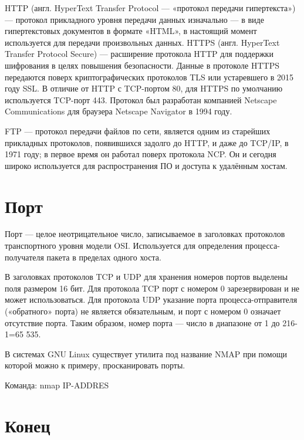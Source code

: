 \documentclass[a4paper,14pt]{extarticle}
\begin{document}
HTTP (англ. HyperText Transfer Protocol — «протокол передачи гипертекста») — протокол прикладного уровня передачи данных изначально — в виде гипертекстовых документов в формате «HTML», в настоящий момент используется для передачи произвольных данных.\newline
\newline
HTTPS (англ. HyperText Transfer Protocol Secure) — расширение протокола HTTP для поддержки шифрования в целях повышения безопасности. Данные в протоколе HTTPS передаются поверх криптографических протоколов TLS или устаревшего в 2015 году SSL. В отличие от HTTP с TCP-портом 80, для HTTPS по умолчанию используется TCP-порт 443.
Протокол был разработан компанией Netscape Communications для браузера Netscape Navigator в 1994 году.\newline

FTP — протокол передачи файлов по сети, является одним из старейших прикладных протоколов, появившихся задолго до HTTP, и даже до TCP/IP, в 1971 году; в первое время он работал поверх протокола NCP. Он и сегодня широко используется для распространения ПО и доступа к удалённым хостам.\newline

\section{Порт}

Порт — целое неотрицательное число, записываемое в заголовках протоколов транспортного уровня модели OSI. Используется для определения процесса-получателя пакета в пределах одного хоста.\newline

В заголовках протоколов TCP и UDP для хранения номеров портов выделены поля размером 16 бит. Для протокола TCP порт с номером 0 зарезервирован и не может использоваться. Для протокола UDP указание порта процесса-отправителя («обратного» порта) не является обязательным, и порт с номером 0 означает отсутствие порта. Таким образом, номер порта — число в диапазоне от 1 до 216-1=65 535.\newline

В системах GNU Linux существует утилита под название NMAP при помощи которой можно к примеру, просканировать порты.\newline

Команда: nmap IP-ADDRES 

\newpage

\section{Конец}
\end{document}
